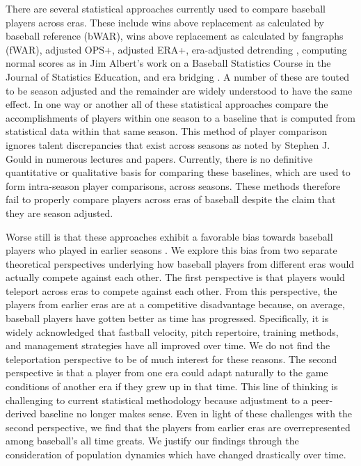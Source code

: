 \documentclass[11pt]{article}\usepackage[]{graphicx}\usepackage[]{color}
\begin{document}
There are several statistical approaches currently used to compare baseball 
players across eras. 
These include 
wins above replacement as calculated by baseball reference (bWAR), %
wins above replacement as calculated by fangraphs (fWAR), %
adjusted OPS+, %
adjusted ERA+, %
era-adjusted detrending \citep{petersen}, 
computing normal scores as in Jim Albert's work on a Baseball Statistics Course 
in the Journal of Statistics Education, 
and era bridging \citep{berry1999eras}. 
A number of these are touted to be season adjusted and the remainder are 
widely understood to have the same effect.  
In one way or another all of these statistical approaches compare the  
accomplishments of players within one season to a baseline that 
is computed from statistical data within that same season.  
This method of player comparison ignores talent discrepancies that exist across 
seasons as noted by Stephen J. Gould in numerous lectures and papers.
Currently, there is no definitive quantitative or qualitative basis for 
comparing these baselines, which are used to form intra-season player 
comparisons, across seasons.  These methods therefore fail to properly 
compare players across eras of baseball despite the claim that they are 
season adjusted.  

Worse still is that these approaches exhibit a favorable bias towards baseball 
players who played in earlier seasons 
\citep{schmidt2005concentration}.  
We explore this bias from two separate theoretical perspectives underlying how 
baseball players from different eras would actually compete against each 
other.  The first perspective is that players would teleport across eras to 
compete against each other.  From this perspective, the players from earlier eras 
are at a competitive disadvantage because, on average, baseball players have 
gotten better as time has progressed.
Specifically, it is widely acknowledged that 
fastball velocity, pitch repertoire, training methods, and management 
strategies have all improved over time.  
We do not find the teleportation perspective to be of 
much interest for these reasons.  The second perspective is that a player from 
one era could adapt naturally to the game conditions of another era if they 
grew up in that time. 
This line of thinking is challenging to current statistical methodology because 
adjustment to a peer-derived baseline no longer makes sense. 
Even in light of these challenges with the second perspective, we find that the 
players from earlier eras are overrepresented among baseball's all time greats.  
We justify our findings through the consideration of population dynamics which 
have changed drastically over time.  %
\end{document}
